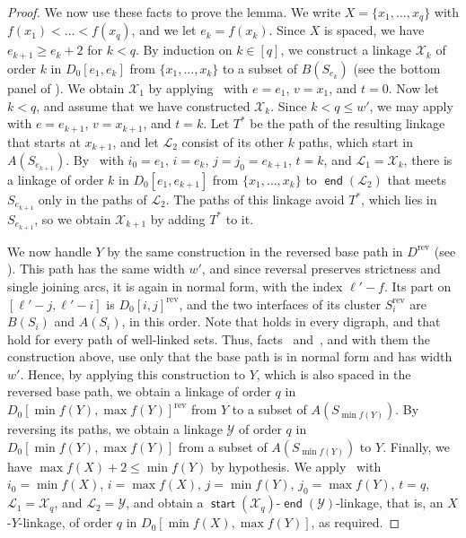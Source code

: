 \documentclass[fontsize=12pt,leading=14pt]{fullpaper}
\DeclareMathOperator{\st}{\mathsf{start}}
\DeclareMathOperator{\en}{\mathsf{end}}
\newcommand{\rev}{\mathrm{rev}}
\newcommand{\Lcal}{\mathcal{L}}
\newcommand{\Xcal}{\mathcal{X}}
\newcommand{\Ycal}{\mathcal{Y}}
\begin{document}
\begin{proof}
  We now use these facts to prove the lemma.
  We write $X=\{x_1,\dots,x_q\}$ with $f(x_1)<\dots<f(x_q)$, and we let $e_k=f(x_k)$.
  Since $X$ is spaced, we have $e_{k+1}\ge e_k+2$ for $k<q$.
  By induction on $k\in[q]$, we construct a linkage $\Xcal_k$ of order $k$ in $D_0[e_1,e_k]$ from $\{x_1,\dots,x_k\}$ to a subset of $B(S_{e_k})$ (see the bottom panel of ).
  We obtain $\Xcal_1$ by applying~ with $e=e_1$, $v=x_1$, and $t=0$.
  Now let $k<q$, and assume that we have constructed $\Xcal_k$.
  Since $k<q\le w'$, we may apply~ with $e=e_{k+1}$, $v=x_{k+1}$, and $t=k$.
  Let $T^*$ be the path of the resulting linkage that starts at $x_{k+1}$, and let $\Lcal_2$ consist of its other $k$ paths, which start in $A(S_{e_{k+1}})$.
  By~ with $i_0=e_1$, $i=e_k$, $j=j_0=e_{k+1}$, $t=k$, and $\Lcal_1=\Xcal_k$, there is a linkage of order $k$ in $D_0[e_1,e_{k+1}]$ from $\{x_1,\dots,x_k\}$ to $\en(\Lcal_2)$ that meets $S_{e_{k+1}}$ only in the paths of $\Lcal_2$.
  The paths of this linkage avoid $T^*$, which lies in $S_{e_{k+1}}$, so we obtain $\Xcal_{k+1}$ by adding $T^*$ to it.

  We now handle $Y$ by the same construction in the reversed base path in $D^\rev$ (see ).
  This path has the same width $w'$, and since reversal preserves strictness and single joining arcs, it is again in normal form, with the index $\ell'-f$.
  Its part on $[\ell'-j,\ell'-i]$ is $D_0[i,j]^\rev$, and the two interfaces of its cluster $S_i^\rev$ are $B(S_i)$ and $A(S_i)$, in this order.
  Note that  holds in every digraph, and that  hold for every path of well-linked sets.
  Thus, facts~ and~, and with them the construction above, use only that the base path is in normal form and has width $w'$.
  Hence, by applying this construction to $Y$, which is also spaced in the reversed base path, we obtain a linkage of order $q$ in $D_0[\min f(Y),\max f(Y)]^\rev$ from $Y$ to a subset of $A(S_{\min f(Y)})$.
  By reversing its paths, we obtain a linkage $\Ycal$ of order $q$ in $D_0[\min f(Y),\max f(Y)]$ from a subset of $A(S_{\min f(Y)})$ to $Y$.
  Finally, we have $\max f(X)+2\le\min f(Y)$ by hypothesis.
  We apply~ with $i_0=\min f(X)$, $i=\max f(X)$, $j=\min f(Y)$, $j_0=\max f(Y)$, $t=q$, $\Lcal_1=\Xcal_q$, and $\Lcal_2=\Ycal$, and obtain a $\st(\Xcal_q)$-$\en(\Ycal)$-linkage, that is, an $X$-$Y$-linkage, of order $q$ in $D_0[\min f(X),\max f(Y)]$, as required.
\end{proof}
\end{document}
